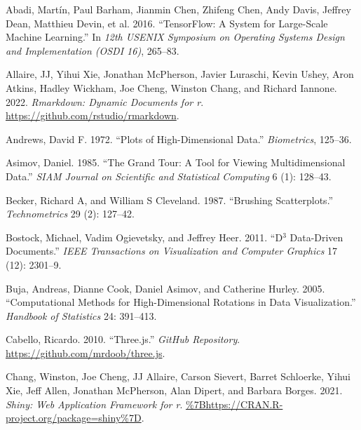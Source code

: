 \hypertarget{refs}{}
\begin{CSLReferences}{1}{0}
\leavevmode{}%
Abadi, Martín, Paul Barham, Jianmin Chen, Zhifeng Chen, Andy Davis, Jeffrey Dean, Matthieu Devin, et al. 2016. {``TensorFlow: A System for Large-Scale Machine Learning.''} In \emph{12th USENIX Symposium on Operating Systems Design and Implementation (OSDI 16)}, 265--83.

\leavevmode{}%
Allaire, JJ, Yihui Xie, Jonathan McPherson, Javier Luraschi, Kevin Ushey, Aron Atkins, Hadley Wickham, Joe Cheng, Winston Chang, and Richard Iannone. 2022. \emph{Rmarkdown: Dynamic Documents for r}. \url{https://github.com/rstudio/rmarkdown}.

\leavevmode{}%
Andrews, David F. 1972. {``Plots of High-Dimensional Data.''} \emph{Biometrics}, 125--36.

\leavevmode{}%
Asimov, Daniel. 1985. {``The Grand Tour: A Tool for Viewing Multidimensional Data.''} \emph{SIAM Journal on Scientific and Statistical Computing} 6 (1): 128--43.

\leavevmode{}%
Becker, Richard A, and William S Cleveland. 1987. {``Brushing Scatterplots.''} \emph{Technometrics} 29 (2): 127--42.

\leavevmode{}%
Bostock, Michael, Vadim Ogievetsky, and Jeffrey Heer. 2011. {``D\(^3\) Data-Driven Documents.''} \emph{IEEE Transactions on Visualization and Computer Graphics} 17 (12): 2301--9.

\leavevmode{}%
Buja, Andreas, Dianne Cook, Daniel Asimov, and Catherine Hurley. 2005. {``Computational Methods for High-Dimensional Rotations in Data Visualization.''} \emph{Handbook of Statistics} 24: 391--413.

\leavevmode{}%
Cabello, Ricardo. 2010. {``Three.js.''} \emph{GitHub Repository}. \url{https://github.com/mrdoob/three.js}.

\leavevmode{}%
Chang, Winston, Joe Cheng, JJ Allaire, Carson Sievert, Barret Schloerke, Yihui Xie, Jeff Allen, Jonathan McPherson, Alan Dipert, and Barbara Borges. 2021. \emph{Shiny: Web Application Framework for r}. \url{\%7Bhttps://CRAN.R-project.org/package=shiny\%7D}.


\end{CSLReferences}
